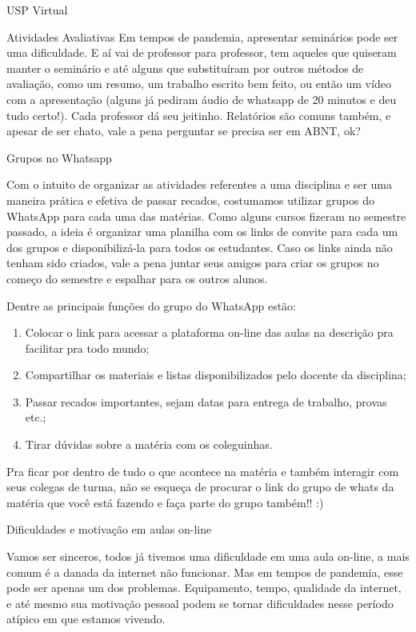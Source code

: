 \begin{secao}{USP Virtual}
\begin{subsecao}{Atividades Avaliativas}
Em tempos de pandemia, apresentar seminários pode ser uma dificuldade. E aí vai de
professor para professor, tem aqueles que quiseram manter o seminário e até alguns
que substituíram por outros métodos de avaliação, como um resumo, um trabalho escrito bem
feito, ou então um vídeo com a apresentação (alguns já pediram áudio de whatsapp de
20 minutos e deu tudo certo!). Cada professor dá seu jeitinho. Relatórios são comuns
também, e apesar de ser chato, vale a pena perguntar se precisa ser em ABNT, ok?

\end{subsecao}

\begin{subsecao}{Grupos no Whatsapp}

Com o intuito de organizar as atividades referentes a uma disciplina e ser uma
maneira prática e efetiva de passar recados, costumamos utilizar grupos do WhatsApp
para cada uma das matérias. Como alguns cursos fizeram no semestre passado, a ideia
é organizar uma planilha com os links de convite para cada um dos grupos e
disponibilizá-la para todos os estudantes. Caso os links ainda não tenham sido criados,
vale a pena juntar seus amigos para criar os grupos no começo do semestre e espalhar
para os outros alunos.

Dentre as principais funções do grupo do WhatsApp estão:

\begin{enumerate}
\item Colocar o link para acessar a plataforma on-line das aulas na descrição pra facilitar pra todo mundo;
\item Compartilhar os materiais e listas disponibilizados pelo docente da disciplina;
\item Passar recados importantes, sejam datas para entrega de trabalho, provas etc.;
\item Tirar dúvidas sobre a matéria com os coleguinhas.
\end{enumerate}

Pra ficar por dentro de tudo o que acontece na matéria e também interagir com seus colegas
de turma, não se esqueça de procurar o link do grupo de whats da matéria que você está fazendo
e faça parte do grupo também!! :)

\end{subsecao}

\begin{subsecao}{Dificuldades e motivação em aulas on-line}

Vamos ser sinceros, todos já tivemos uma dificuldade em uma aula on-line,
a mais comum é a danada da internet não funcionar. Mas em tempos de pandemia,
esse pode ser apenas um dos problemas. Equipamento, tempo, qualidade da internet,
e até mesmo sua motivação pessoal podem se tornar dificuldades nesse período atípico
em que estamos vivendo.


\end{subsecao}
\end{secao}
